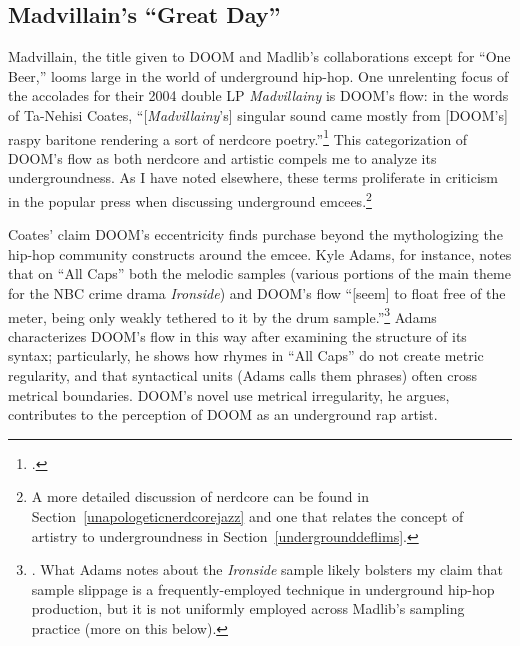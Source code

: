 \subsection*{\centering Madvillain's ``Great Day''}

Madvillain, the title given to DOOM and Madlib's collaborations except for ``One Beer,'' looms large
in the world of underground hip-hop. One unrelenting focus of the accolades for  their 2004 double LP 
\textit{Madvillainy} is DOOM's flow: in the words of Ta-Nehisi Coates, ``[\textit{Madvillainy}'s] 
singular sound came mostly from [DOOM's] raspy baritone rendering a sort of nerdcore poetry.''\footnote{
    \cite{ta-nehisicoatesMaskDoomNonconformist2009}.}
This categorization of DOOM's flow as both nerdcore and artistic compels me to analyze its undergroundness.
As I have noted elsewhere, these terms proliferate in criticism in the popular press when discussing
underground emcees.\footnote{
    A more detailed discussion of nerdcore can be found in Section~\ref{unapologeticnerdcorejazz} and
    one that relates the concept of artistry to undergroundness in Section~\ref{undergrounddeflims}.}
    \clearpage

Coates' claim DOOM's eccentricity finds purchase beyond the mythologizing the hip-hop community constructs
around the emcee. Kyle Adams, for instance, notes that on ``All Caps'' both the melodic samples (various 
portions of the main theme for the NBC crime drama \textit{Ironside}) and DOOM's flow ``[seem] to float free
of the meter, being only weakly tethered to it by the drum sample.''\footnote{
    \cite{kyleadamsMetricalTechniquesFlow2009}. What Adams notes about the \textit{Ironside} sample likely
    bolsters my claim that sample slippage is a frequently-employed technique in underground hip-hop 
    production, but it is not uniformly employed across Madlib's sampling practice (more on this below).}
Adams characterizes DOOM's flow in this way after examining the structure of its syntax; particularly, he
shows how rhymes in ``All Caps'' do not create metric regularity, and that syntactical units (Adams calls
them phrases) often cross metrical boundaries. DOOM's novel use metrical irregularity, he argues, contributes
to the perception of DOOM as an underground rap artist.

